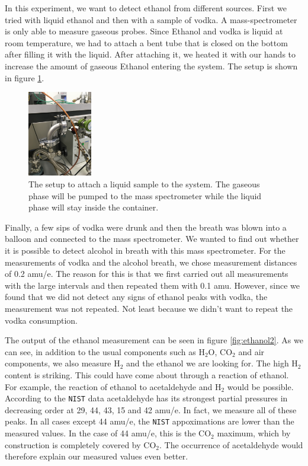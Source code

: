     In this experiment, we want to detect ethanol from different sources. First we tried with liquid ethanol and then with a sample of vodka. 
    A mass-spectrometer is only able to measure gaseous probes. Since Ethanol and vodka is liquid at room temperature, we had to attach a bent tube that is closed on the bottom after filling it with the liquid. After attaching it, we heated it with our hands to increase the amount of gaseous Ethanol entering the system. The setup is shown in figure \ref{fig:ethanol}.
    \begin{figure}[h!]
    \centering
    \includegraphics[angle=-90, origin=c,width=0.25\textwidth]{Report/pictures/liquids.JPG}
    \caption{The setup to attach a liquid sample to the system. The gaseous phase will be pumped to the mass spectrometer while the liquid phase will stay inside the container.}
    \label{fig:ethanol}
    \end{figure}
    Finally, a few sips of vodka were drunk and then the breath was blown into a balloon and connected to the mass spectrometer. We wanted to find out whether it is possible to detect alcohol in breath with this mass spectrometer. For the measurements of vodka and the alcohol breath, we chose measurement distances of 0.2 amu/e. The reason for this is that we first carried out all measurements with the large intervals and then repeated them with 0.1 amu. However, since we found that we did not detect any signs of ethanol peaks with vodka, the measurement was not repeated. Not least because we didn't want to repeat the vodka consumption. 
    
    The output of the ethanol measurement can be seen in figure \ref{fig:ethanol2}. As we can see, in addition to the usual components such as H$_2$O, CO$_2$ and air components, we also measure H$_2$ and the ethanol we are looking for. The high H$_2$ content is striking. This could have come about through a reaction of ethanol. For example, the reaction of ethanol to acetaldehyde and H$_2$ would be possible. According to the \texttt{NIST} data acetaldehyde has its strongest partial pressures in decreasing order at 29, 44, 43, 15 and 42 amu/e. In fact, we measure all of these peaks. In all cases except 44 amu/e, the \texttt{NIST} appoximations are lower than the measured values. In the case of 44 amu/e, this is the CO$_2$ maximum, which by construction is completely covered by CO$_2$. The occurrence of acetaldehyde would therefore explain our measured values even better. 
    
